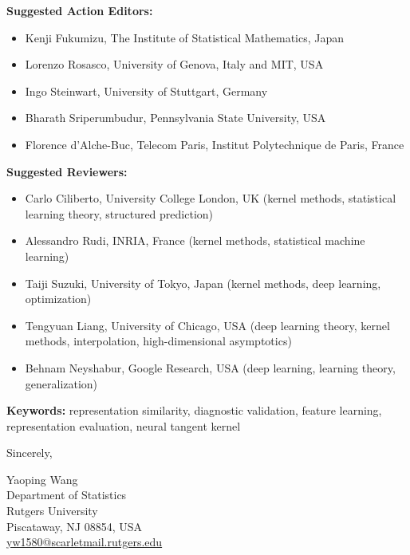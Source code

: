 \bigskip

\noindent\textbf{Suggested Action Editors:}
\begin{itemize}
    \item Kenji Fukumizu, The Institute of Statistical Mathematics, Japan
    \item Lorenzo Rosasco, University of Genova, Italy and MIT, USA
    \item Ingo Steinwart, University of Stuttgart, Germany
    \item Bharath Sriperumbudur, Pennsylvania State University, USA
    \item Florence d'Alche-Buc, Telecom Paris, Institut Polytechnique de Paris, France
\end{itemize}

\noindent\textbf{Suggested Reviewers:}
\begin{itemize}
    \item Carlo Ciliberto, University College London, UK (kernel methods, statistical learning theory, structured prediction)
    \item Alessandro Rudi, INRIA, France (kernel methods, statistical machine learning)
    \item Taiji Suzuki, University of Tokyo, Japan (kernel methods, deep learning, optimization)
    \item Tengyuan Liang, University of Chicago, USA (deep learning theory, kernel methods, interpolation, high-dimensional asymptotics)
    \item Behnam Neyshabur, Google Research, USA (deep learning, learning theory, generalization)
\end{itemize}

\noindent\textbf{Keywords:} representation similarity, diagnostic validation, feature learning, representation evaluation, neural tangent kernel

\bigskip

Sincerely,

\medskip

Yaoping Wang\\
Department of Statistics\\
Rutgers University\\
Piscataway, NJ 08854, USA\\
\url{yw1580@scarletmail.rutgers.edu}


